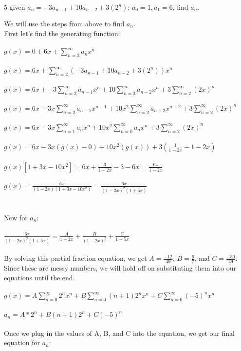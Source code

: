\begin{problem} 5
given $a_n = -3a_{n-1} + 10a_{n-2} + 3(2^n)$; $a_0 = 1, a_1 = 6$, find $a_n$.
\end{problem}
\begin{solution}
We will use the steps from above to find $a_n$. \\

\noindent
First let's find the generating function: \\\\
$g(x) = 0 + 6x + \sum_{n = 2}^\infty a_n x^n$ \\\\
$g(x) = 6x + \sum_{n = 2}^\infty(-3a_{n-1} + 10a_{n-2} + 3(2^n))x^n$\\\\
$g(x) = 6x + -3\sum_{n = 2}^\infty a_{n-1}x^n + 10\sum_{n = 2}^\infty a_{n-2}x^n + 3\sum_{n = 2}^\infty (2x)^n$\\\\
$g(x) =  6x - 3x\sum_{n = 2}^\infty a_{n-1}x^{n-1} + 10x^2\sum_{n = 2}^\infty a_{n-2}x^{n-2} + 3\sum_{n = 2}^\infty(2x)^n$\\\\
$g(x) =  6x - 3x\sum_{n = 1}^\infty a_{n}x^{n} + 10x^2\sum_{n = 0}^\infty a_{n}x^{n} + 3\sum_{n = 2}^\infty(2x)^n$\\\\
$g(x) =  6x - 3x(g(x) - 0) + 10x^2(g(x)) + 3(\frac{1}{1-2x}-1-2x)$\\\\
$g(x)[1+3x-10x^2]=6x+\frac{3}{1-2x}-3-6x=\frac{6x}{1-2x}$ \\\\
$g(x)=\frac{6x}{(1-2x)(1+3x-10x^2)}=\frac{6x}{(1-2x)^2(1+5x)}$ \\\\
\noindent \\
Now for $a_n$:\\\\
$\frac{6x}{(1-2x)^2(1+5x)} = \frac{A}{1-2x}+\frac{B}{(1-2x)^2}+\frac{C}{1+5x}$\\\\
\noindent
By solving this partial fraction equation, we get $A=\frac{-12}{49}$, $B=\frac{6}{7}$, and $C=\frac{-30}{49}$. Since these are messy numbers, we will hold off on substituting them into our equations until the end. \\\\
$g(x) =  A\sum_{n = 0}^\infty 2^n x^n + B\sum_{n = 0}^\infty (n+1)2^n x^{n} + C\sum_{n = 0}^\infty(-5)^n x^n$\\\\
$a_n = A*2^n + B(n+1)2^n + C(-5)^n$ \\\\
\noindent
Once we plug in the values of A, B, and C into the equation, we get our final equation for $a_n$: \\\\

\end{solution} \\

% 
